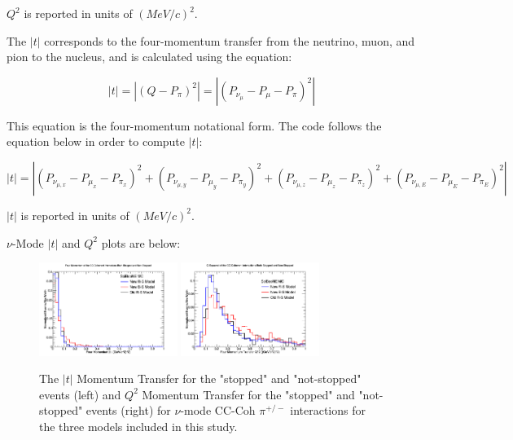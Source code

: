 \documentclass[11pt]{article}
\begin{document}
\noindent
$Q^2$ is reported in units of $(MeV/c)^2$.

The $|t|$ corresponds to the four-momentum transfer from the neutrino, muon, and pion to the nucleus, and is calculated using the equation:

\begin{equation}
|t| = |(Q - P_\pi)^2| = |(P_{\nu_\mu} - P_\mu - P_\pi)^2|
\end{equation}

\noindent
This equation is the four-momentum notational form. The code follows the equation below in order to compute $|t|$:

\begin{equation}
|t| = |(P_{\nu_{\mu,x}} - P_{\mu_x} - P_{\pi_x})^2 + (P_{\nu_{\mu,y}} - P_{\mu_y} - P_{\pi_y})^2 + (P_{\nu_{\mu,z}} - P_{\mu_z} - P_{\pi_z})^2 + (P_{\nu_{\mu,E}} - P_{\mu_E} - P_{\pi_E})^2|
\end{equation}

\noindent
$|t|$ is reported in units of $(MeV/c)^2$.


$\nu$-Mode $|t|$ and $Q^2$ plots are below:

\begin{figure}[H]
\centering
\includegraphics[width=0.4\textwidth]{CCCohPlots/NMCCCohGoodT.png}
\includegraphics[width=0.4\textwidth]{CCCohPlots/NMCCCohGoodQ2.png}
\caption{The $|t|$ Momentum Transfer for the "stopped" and "not-stopped" events (left) and $Q^2$ Momentum Transfer for the "stopped" and "not-stopped" events (right) for $\nu$-mode CC-Coh $\pi^{+/-}$ interactions for the three models included in this study.}
\end{figure}\label{fig:AntiNuModeCCCohGoodTAndQ2}
\end{document}

